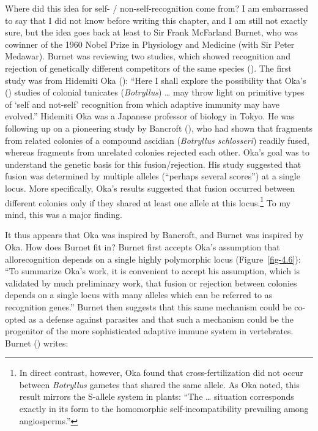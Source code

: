 \documentclass[
  american,
  letterpaper,
]{book}
\begin{document}
Where did this idea for self- / non-self-recognition come from? I am
embarrassed to say that I did not know before writing this chapter, and
I am still not exactly sure, but the idea goes back at least to Sir
Frank McFarland Burnet, who was cowinner of the 1960 Nobel Prize in
Physiology and Medicine (with Sir Peter Medawar). Burnet was reviewing
two studies, which showed recognition and rejection of genetically
different competitors of the same species
(). The first study was from
Hidemiti Oka (): ``Here I shall explore the
possibility that Oka's () studies of
colonial tunicates (\emph{Botryllus}) \ldots{} may throw light on
primitive types of `self and not-self' recognition from which adaptive
immunity may have evolved.'' Hidemiti Oka was a Japanese professor of
biology in Tokyo. He was following up on a pioneering study by Bancroft
(), who had shown that fragments from
related colonies of a compound ascidian (\emph{Botryllus schlosseri})
readily fused, whereas fragments from unrelated colonies rejected each
other. Oka's goal was to understand the genetic basis for this
fusion/rejection. His study suggested that fusion was determined by
multiple alleles (``perhaps several scores'') at a single locus. More
specifically, Oka's results suggested that fusion occurred between
different colonies only if they shared at least one allele at this
locus.\footnote{In direct contrast, however, Oka found that
  cross-fertilization did not occur between \emph{Botryllus} gametes
  that shared the same allele. As Oka noted, this result mirrors the
  S-allele system in plants: ``The \ldots{} situation corresponds
  exactly in its form to the homomorphic self-incompatibility prevailing
  among angiosperms.''} To my mind, this was a major finding.

It thus appears that Oka was inspired by Bancroft, and Burnet was
inspired by Oka. How does Burnet fit in? Burnet first accepts Oka's
assumption that allorecognition depends on a single highly polymorphic
locus (Figure~\ref{fig-4.6}): ``To summarize Oka's work, it is
convenient to accept his assumption, which is validated by much
preliminary work, that fusion or rejection between colonies depends on a
single locus with many alleles which can be referred to as recognition
genes.'' Burnet then suggests that this same mechanism could be co-opted
as a defense against parasites and that such a mechanism could be the
progenitor of the more sophisticated adaptive immune system in
vertebrates. Burnet () writes:
\end{document}
